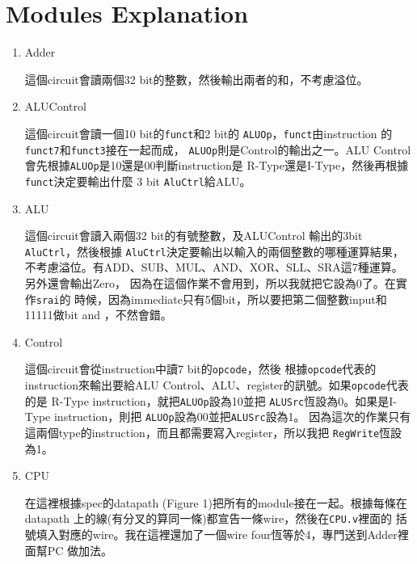 \documentclass{article}
\begin{document}
\section*{Modules Explanation}

\begin{enumerate}
    \item Adder

          這個circuit會讀兩個32 bit的整數，然後輸出兩者的和，不考慮溢位。

    \item ALU\textunderscore Control

          這個circuit會讀一個10 bit的\texttt{funct}和2 bit的
          \texttt{ALUOp}，\texttt{funct}由instruction
          的\texttt{funct7}和\texttt{funct3}接在一起而成，
          \texttt{ALUOp}則是Control的輸出之一。ALU\textunderscore
          Control會先根據\texttt{ALUOp}是10還是00判斷instruction是
          R-Type還是I-Type，然後再根據\texttt{funct}決定要輸出什麼
          3 bit \texttt{AluCtrl}給ALU。

    \item ALU

          這個circuit會讀入兩個32 bit的有號整數，及ALU\textunderscore Control
          輸出的3bit \texttt{AluCtrl}，然後根據
          \texttt{AluCtrl}決定要輸出以輸入的兩個整數的哪種運算結果，
          不考慮溢位。有ADD、SUB、MUL、AND、XOR、SLL、SRA這7種運算。另外還會輸出Zero，
          因為在這個作業不會用到，所以我就把它設為0了。在實作\texttt{srai}的
          時候，因為immediate只有5個bit，所以要把第二個整數input和11111做bit and
          ，不然會錯。

    \item Control

          這個circuit會從instruction中讀7 bit的\texttt{opcode}，然後
          根據\texttt{opcode}代表的instruction來輸出要給ALU\textunderscore
          Control、ALU、register的訊號。如果\texttt{opcode}代表的是
          R-Type instruction，就把\texttt{ALUOp}設為10並把
          \texttt{ALUSrc}恆設為0。如果是I-Type instruction，則把
          \texttt{ALUOp}設為00並把\texttt{ALUSrc}設為1。
          因為這次的作業只有這兩個type的instruction，而且都需要寫入register，所以我把
          \texttt{RegWrite}恆設為1。
    \item CPU

          在這裡根據spec的datapath (Figure 1)把所有的module接在一起。根據每條在datapath
          上的線(有分叉的算同一條)都宣告一條wire，然後在\texttt{CPU.v}裡面的
          括號填入對應的wire。我在這裡還加了一個wire four恆等於4，專門送到Adder裡面幫PC
          做加法。


\end{enumerate}
\end{document}
